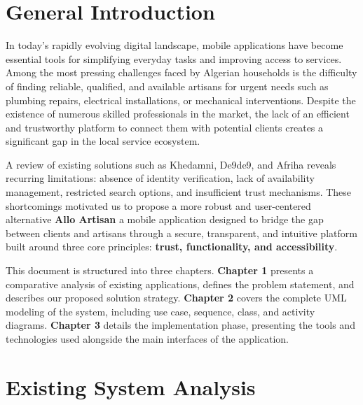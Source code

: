 \documentclass[12pt,a4paper]{report}
\begin{document}
\listoffigures
\newpage
\chapter*{General Introduction}
\thispagestyle{fancy}
In today's rapidly evolving digital landscape, mobile applications have become essential tools 
for simplifying everyday tasks and improving access to services. Among the most pressing 
challenges faced by Algerian households is the difficulty of finding reliable, qualified, and 
available artisans for urgent needs such as plumbing repairs, electrical installations, or 
mechanical interventions. Despite the existence of numerous skilled professionals in the 
market, the lack of an efficient and trustworthy platform to connect them with potential clients 
creates a significant gap in the local service ecosystem.

A review of existing solutions such as Khedamni, De9de9, and Afriha reveals recurring 
limitations: absence of identity verification, lack of availability management, restricted search 
options, and insufficient trust mechanisms. These shortcomings motivated us to propose a 
more robust and user-centered alternative  \textbf{Allo Artisan}  a mobile application designed to 
bridge the gap between clients and artisans through a secure, transparent, and intuitive 
platform built around three core principles: \textbf{trust, functionality, and accessibility}.

This document is structured into three chapters. \newline\textbf{Chapter 1} presents a comparative analysis of 
existing applications, defines the problem statement, and describes our proposed solution 
strategy. \newline\textbf{Chapter 2} covers the complete UML modeling of the system, including use case, 
sequence, class, and activity diagrams. \newline\textbf{Chapter 3} details the implementation phase, 
presenting the tools and technologies used alongside the main interfaces of the application.

\newpage
\pagestyle{fancy}
\setcounter{page}{1}
\chapter{Existing System Analysis}
\end{document}
